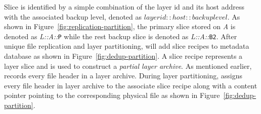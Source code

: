 Slice is identified by a simple combination of the layer id and its host address 
with the associated backup level,
denoted as $layerid::host::backuplevel$. %
As shown in Figure~\ref{fig:replication-partition},
the primary slice stored on \emph{A} is denoted as \emph{L::}\emph{A::}\texttt{P}
while the rest backup slice is denoted as \emph{L::}\emph{A::}\texttt{B2}.
After unique file replication and layer partitioning, 
\sysname will add slice recipes 
to metadata database as shown in Figure~\ref{fig:dedup-partition}.
A slice recipe represents a layer slice and
is used to construct a \emph{partial layer archive}.
% 
%
As mentioned earlier, 
\sysname records every file header in a layer archive.
During layer partitioning,
%
\sysname
assigns every file header in layer archive to
the associate slice recipe 
along with a content pointer pointing to the corresponding physical file as shown in Figure~\ref{fig:dedup-partition}. 
%
